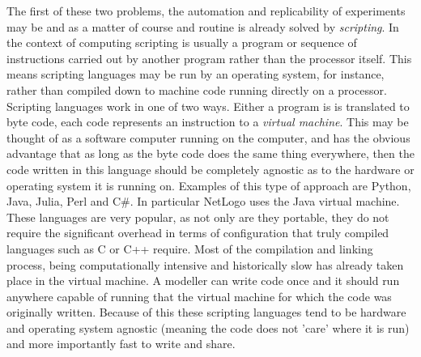 \documentclass[runningheads]{llncs}
\begin{document}
The first of these two problems, the automation and replicability of
experiments  may be and as a matter of course and routine is already solved by
\emph{scripting}.  In the context of computing scripting is usually a program
or sequence of instructions carried out by another program rather than the
processor itself. This means scripting languages may be run by an
operating system, for instance, rather than compiled down to machine code
running directly on a processor.  Scripting languages work in one of two ways.
Either a program is is translated to  byte code, each code represents an
instruction to a \emph{virtual machine}.  This may be thought of as a software
computer running on the computer, and has the  obvious advantage that as long
as the byte code does the same thing everywhere, then the code written in this
language should be completely agnostic as to the hardware or operating system
it is running on.  Examples of this type of approach are Python, Java, Julia,
Perl and  C\#. In particular NetLogo uses the Java virtual machine. These
languages are very popular, as not only are they portable, they do not require
the significant overhead in terms of configuration that truly compiled
languages such as C or C++ require.  Most of the compilation and linking
process, being computationally intensive and historically slow  has already
taken place in the virtual machine. A modeller can write code once and it
should run anywhere capable of running that the virtual machine for which the
code was originally written. Because of this these scripting languages tend to
be hardware and operating system agnostic (meaning the code does not 'care'
where it is run) and more importantly fast to write and share.
\end{document}
